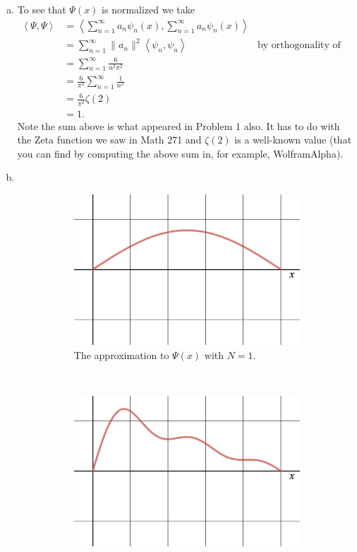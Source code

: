 \documentclass[12pt]{article} %
\newcommand{\innprod}[2]{\left\langle #1, #2\right\rangle}
\begin{document}
\begin{solution}
	\begin{enumerate}[(a)]
		\item To see that $\Psi(x)$ is normalized we take
		\begin{align*}
			\innprod{\Psi}{\Psi} &= \innprod{\sum_{n=1}^\infty a_n \psi_n(x)}{\sum_{n=1}^\infty a_n \psi_n(x)}\\
			&= \sum_{n=1}^\infty \|a_n\|^2 \innprod{\psi_n}{\psi_n} &\textrm{by orthogonality of the states}\\
			&= \sum_{n=1}^\infty \frac{6}{n^2 \pi^2}\\
			&= \frac{6}{\pi^2} \sum_{n=1}^\infty \frac{1}{n^2}\\
			&= \frac{6}{\pi^2} \zeta(2)\\
			&= 1.
		\end{align*}
		Note the sum above is what appeared in Problem 1 also. It has to do with the Zeta function we saw in Math 271 and $\zeta(2)$ is a well-known value (that you can find by computing the above sum in, for example, WolframAlpha).
		\item ~
	\begin{figure}[H]
	\centering
		\begin{subfigure}[h]{0.48\textwidth}
			\centering
			\includegraphics[width=.8\textwidth]{figures/n=1.png}
			\caption{The approximation to $\Psi(x)$ with $N=1$.}
		\end{subfigure}
		~
		\begin{subfigure}[h]{0.48\textwidth}
			\centering
			\includegraphics[width=.8\textwidth]{figures/n=5.png}

\end{subfigure}
\end{figure}
\end{enumerate}
\end{solution}
\end{document}
